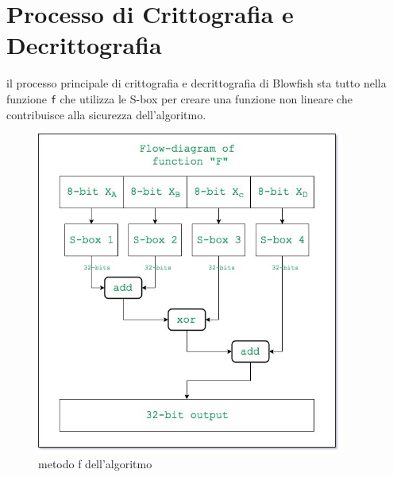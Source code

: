 \documentclass[a4paper,12pt]{report}
\begin{document}
		\section*{Processo di Crittografia e Decrittografia}
		il processo principale di crittografia e decrittografia di Blowfish sta tutto 
		nella funzione \texttt{f} che utilizza le S-box per creare una funzione non
		lineare che contribuisce alla sicurezza dell'algoritmo.

		\begin{figure}[H]
			\centering
			\includegraphics[width=0.9\textwidth]{F-blowfish.jpg}
			\caption{metodo f dell'algoritmo \cite{blowfish-algorithm}}
			\label{fig:f}
		\end{figure}
\end{document}
